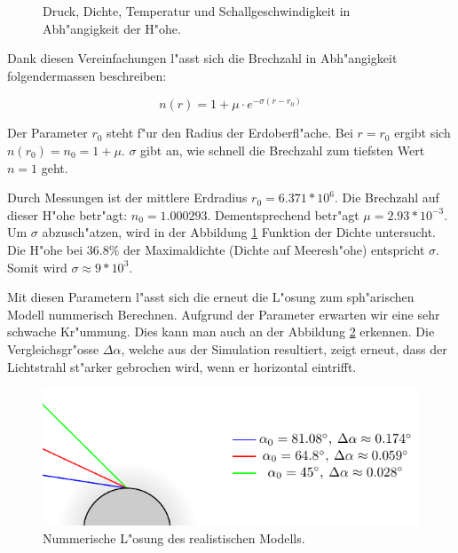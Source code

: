 \begin{refsection}
\begin{figure}
  \caption{Druck, Dichte, Temperatur und Schallgeschwindigkeit in Abh"angigkeit der H"ohe. \label{fig:athmosphere_profile}}
\end{figure}

Dank diesen Vereinfachungen l"asst sich die Brechzahl in Abh"angigkeit folgendermassen beschreiben:

$$n(r) = 1 + \mu \cdot e^{-\sigma (r - r_0)}$$

Der Parameter $r_0$ steht f"ur den Radius der Erdoberfl"ache. 
Bei $r = r_0$ ergibt sich $n(r_0) = n_0 = 1 + \mu$. 
$\sigma$ gibt an, wie schnell die Brechzahl zum tiefsten Wert $n = 1$ geht. 




Durch Messungen ist der mittlere Erdradius $r_0 = 6.371 * 10^6$. 
Die Brechzahl auf dieser H"ohe betr"agt: $n_0 = 1.000293$.
Dementsprechend betr"agt $\mu = 2.93 * 10^{-3}$. 
Um $\sigma$ abzusch"atzen, wird in der Abbildung \ref{fig:athmosphere_profile} Funktion der Dichte untersucht. 
Die H"ohe bei 36.8\% der Maximaldichte (Dichte auf Meeresh"ohe) entspricht $\sigma$. 
Somit wird $\sigma \approx 9 * 10^3$.

Mit diesen Parametern l"asst sich die erneut die L"osung zum sph"arischen Modell nummerisch Berechnen. 
Aufgrund der Parameter erwarten wir eine sehr schwache Kr"ummung. 
Dies kann man auch an der Abbildung \ref{fig:sphere_real} erkennen. 
Die Vergleichsgr"osse $\Delta \alpha$, welche aus der Simulation resultiert, zeigt erneut, dass der Lichtstrahl st"arker gebrochen wird, wenn er horizontal eintrifft. 

\begin{figure}
  \centering
  \includegraphics[scale=1]{licht/standalone/fig_real_simulation.pdf}
  \caption{Nummerische L"osung des realistischen Modells. \label{fig:sphere_real} } 
\end{figure}


\end{refsection}
